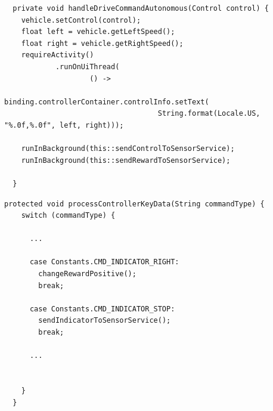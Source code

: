 \documentclass[12pt]{report}
\begin{document}
\begin{lstlisting}
  private void handleDriveCommandAutonomous(Control control) {
    vehicle.setControl(control);
    float left = vehicle.getLeftSpeed();
    float right = vehicle.getRightSpeed();
    requireActivity()
            .runOnUiThread(
                    () ->
                            binding.controllerContainer.controlInfo.setText(
                                    String.format(Locale.US, "%.0f,%.0f", left, right)));

    runInBackground(this::sendControlToSensorService);
    runInBackground(this::sendRewardToSensorService);

  }
\end{lstlisting}

\begin{lstlisting}
protected void processControllerKeyData(String commandType) {
    switch (commandType) {

      ...

      case Constants.CMD_INDICATOR_RIGHT:
        changeRewardPositive();
        break;

      case Constants.CMD_INDICATOR_STOP:
        sendIndicatorToSensorService();
        break;

      ...

      
    }
  }
\end{lstlisting}
\end{document}
